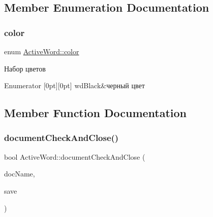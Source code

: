 \subsection{Member Enumeration Documentation}
\mbox{\label{class_active_word_a8d6e8aa40990a0f496a31c419e0849f8}} 
\subsubsection{\texorpdfstring{color}{color}}
{\footnotesize\ttfamily enum \hyperlink{class_active_word_a8d6e8aa40990a0f496a31c419e0849f8}{Active\+Word\+::color}}



Набор цветов 

\begin{DoxyEnumFields}{Enumerator}
[0pt][0pt]{}\mbox{\label{class_active_word_a8d6e8aa40990a0f496a31c419e0849f8a39892314c5f58ec0115b8f87d5fff1d7}} 
wd\+Black&черный цвет \\
\hline

\end{DoxyEnumFields}


\subsection{Member Function Documentation}
\mbox{\label{class_active_word_aa891183cf73a7b63a60e9d9c8674c360}} 
\subsubsection{\texorpdfstring{document\+Check\+And\+Close()}{documentCheckAndClose()}}
{\footnotesize\ttfamily bool Active\+Word\+::document\+Check\+And\+Close (\begin{DoxyParamCaption}\item[{Q\+String}]{doc\+Name,  }\item[{bool}]{save }\end{DoxyParamCaption})}



